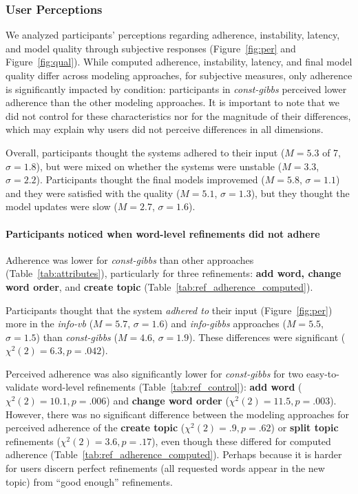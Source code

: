 \subsubsection{User Perceptions}
We analyzed participants' perceptions regarding adherence, instability, latency, and model quality through subjective responses (Figure~\ref{fig:per} and Figure~\ref{fig:qual}). 
While computed adherence, instability, latency, and final model quality differ across modeling approaches, for subjective measures, only adherence is significantly impacted by condition: participants in \textit{const-gibbs} perceived lower adherence than the other modeling approaches.
It is important to note that we did not control for these characteristics nor for the magnitude of their differences, which may explain why users did not perceive differences in all dimensions.

Overall, participants thought the systems adhered to their input
($M=5.3$ of 7, $\sigma=1.8$), but were mixed on whether the systems
were unstable ($M=3.3$, $\sigma=2.2$). Participants thought
the final models improvemed ($M=5.8$, $\sigma=1.1$) and they
were satisfied with the quality ($M=5.1$, $\sigma=1.3$), but they
thought the model updates were slow ($M=2.7$, $\sigma=1.6$).

\paragraph{Participants noticed when word-level refinements did not adhere}
\label{sec:control}

Adherence was lower for \textit{const-gibbs} than other approaches
(Table~\ref{tab:attributes}), particularly for three refinements:
\textbf{add word, change word order}, and \textbf{create topic}
(Table~\ref{tab:ref_adherence_computed}).

Participants thought that the system \textit{adhered to} their input
(Figure~\ref{fig:per}) more in the \textit{info-vb} ($M=5.7$,
$\sigma=1.6$) and \textit{info-gibbs} approaches ($M=5.5$,
$\sigma=1.5$) than \textit{const-gibbs} ($M=4.6$, $\sigma=1.9$).
These differences were significant (${\chi}^2(2)=6.3,
p=.042$).

Perceived adherence was also significantly lower for
\textit{const-gibbs} for two easy-to-validate word-level refinements
(Table~\ref{tab:ref_control}): \textbf{add word} (${\chi}^2(2)=10.1,
p=.006$) and \textbf{change word order} (${\chi}^2(2)=11.5, p=.003$).
However, there was no significant difference between the modeling
approaches for perceived adherence of the \textbf{create topic}
(${\chi}^2(2)=.9, p=.62$) or \textbf{split topic} refinements
(${\chi}^2(2)=3.6, p=.17$), even though these differed for computed
adherence (Table~\ref{tab:ref_adherence_computed}).  Perhaps because
it is harder for users discern perfect refinements (all requested
words appear in the new topic) from ``good enough'' refinements.

